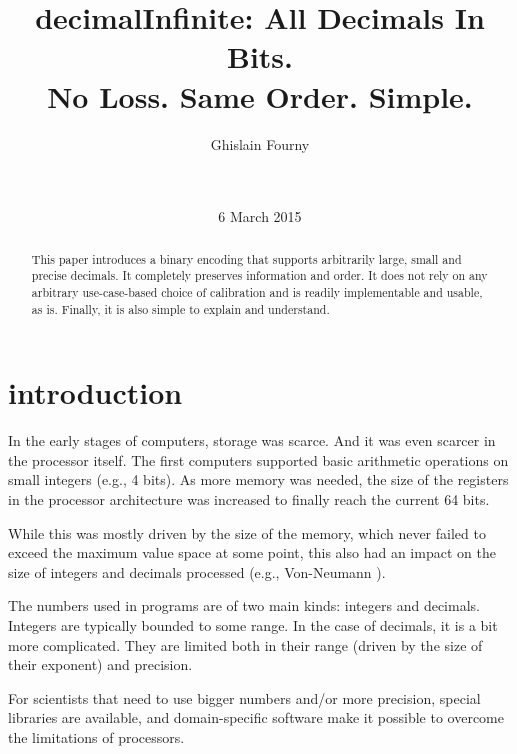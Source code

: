 \documentclass{acm_proc_article-sp}
\begin{document}
\title{decimalInfinite: All Decimals In Bits.\\ No Loss. Same Order. Simple.}


\author{
\alignauthor
Ghislain Fourny\\
       \\
       \\
}
\date{6 March 2015}
\maketitle

\begin{abstract}
This paper introduces a binary encoding that supports arbitrarily large, small and precise decimals. It completely preserves information and order. It does not rely on any arbitrary use-case-based choice of calibration and is readily implementable and usable, as is. Finally, it is also simple to explain and understand.
\end{abstract}

\section{introduction}
In the early stages of computers, storage was scarce. And it was even scarcer in the processor itself. The first computers supported basic arithmetic operations on small integers (e.g., 4 bits). As more memory was needed, the size of the registers in the processor architecture was increased to finally reach the current 64 bits.

While this was mostly driven by the size of the memory, which never failed to exceed the maximum value space at some point, this also had an impact on the size of integers and decimals processed (e.g., Von-Neumann \cite{VonNeumann1946}).

The numbers used in programs are of two main kinds: integers and decimals. Integers are typically bounded to some range. In the case of decimals, it is a bit more complicated. They are limited both in their range (driven by the size of their exponent) and precision.

For scientists that need to use bigger numbers and/or more precision, special libraries are available, and domain-specific software \cite{MAPLE} \cite{MATHEMATICA} \cite{MATLAB} make it possible to overcome the limitations of processors.
\end{document}
